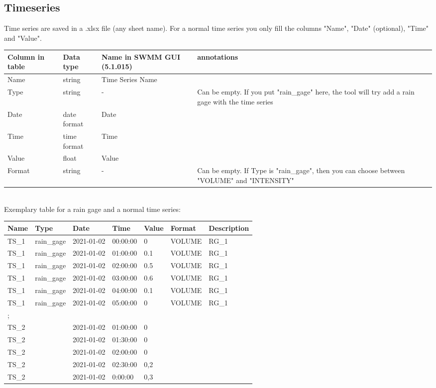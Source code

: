 \documentclass[10pt,a4paper,oneside]{scrbook}
\begin{document}
\subsection{Timeseries}
Time series are saved in a .xlsx file (any sheet name). For a normal time series you only fill the columns "Name", "Date" (optional), "Time" and "Value".\\
\begin{tabular}{p{1.4cm}|p{1.9cm}|P{3cm}|P{7.7cm}}
\hline 
\textbf{Column in table} & \textbf{Data type} & \textbf{Name in SWMM GUI (5.1.015)} & \textbf{annotations}\\ 
\hline 
Name & string & Time Series Name & \\
Type & string & - & Can be empty. If you put "rain\_gage" here, the tool will try add a rain gage with the time series\\ 
Date & date format & Date & \\ 
Time & time format & Time & \\
Value & float &  Value &  \\
Format & string & - & Can be empty. If Type is "rain\_gage", then you can choose between "VOLUME" and "INTENSITY"\\
\hline
\end{tabular}
\\
Exemplary table for a rain gage and a normal time series:\\
\begin{tabular}{|p{1.3cm}|p{1.6cm}|P{1.8cm}|P{1.6cm}|P{1.0cm}|P{1.6cm}|P{1.9cm}|}
\hline 
\textbf{Name} & \textbf{Type} & \textbf{Date} & \textbf{Time} & \textbf{Value} & \textbf{Format} & \textbf{Description}\\
\hline
TS\_1 & rain\_gage & 2021-01-02 & 00:00:00 &	0	& VOLUME	& RG\_1\\
\hline
TS\_1 &	rain\_gage & 2021-01-02 & 01:00:00 & 0.1	& VOLUME	& RG\_1\\
\hline
TS\_1 &	rain\_gage & 2021-01-02 & 02:00:00 &	0.5	& VOLUME	& RG\_1\\
\hline
TS\_1 & rain\_gage & 2021-01-02 & 03:00:00 &	0.6	& VOLUME	& RG\_1\\
\hline
TS\_1 &	rain\_gage & 2021-01-02 & 04:00:00 &	0.1	& VOLUME	& RG\_1\\
\hline
TS\_1 &	rain\_gage &	2021-01-02 & 05:00:00 &	0	& VOLUME	& RG\_1\\
\hline
; & & & & & &\\
\hline
TS\_2 &	 &	2021-01-02 & 01:00:00 &	0	& 	& \\
\hline
TS\_2 &  & 2021-01-02 & 01:30:00 &	0	& 	& \\
\hline
TS\_2 &	 & 2021-01-02 & 02:00:00 &	0	& 	& \\
\hline
TS\_2 &	 &	2021-01-02 & 02:30:00 &	0,2	& 	&\\
\hline
TS\_2 &	 &	2021-01-02 & 0:00:00 &	0,3	& 	& \\
\hline
\end{tabular}
\end{document}
